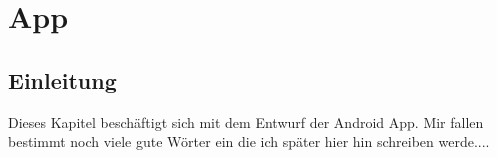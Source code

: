 \chapter{App}
\section{Einleitung}
Dieses Kapitel beschäftigt sich mit dem Entwurf der Android App. Mir fallen bestimmt noch viele gute Wörter ein die ich später hier hin schreiben werde....